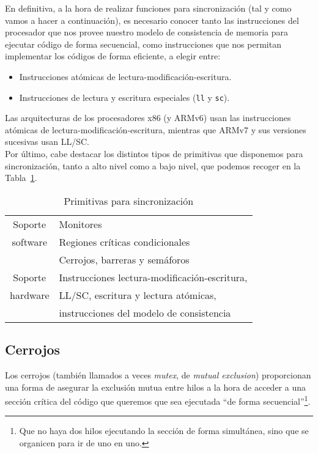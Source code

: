 En definitiva, a la hora de realizar funciones para sincronización (tal y como vamos a hacer a continuación), es necesario conocer tanto las instrucciones del procesador que nos provee nuestro modelo de consistencia de memoria para ejecutar código de forma secuencial, como instrucciones que nos permitan implementar los códigos de forma eficiente, a elegir entre:
\begin{itemize}
    \item Instrucciones atómicas de lectura-modificación-escritura.
    \item Instrucciones de lectura y escritura especiales (\verb|ll| y \verb|sc|).
\end{itemize}
Las arquitecturas de los procesadores x86 (y ARMv6) usan las instrucciones atómicas de lectura-modificación-escritura, mientras que ARMv7 y sus versiones sucesivas usan LL/SC.\\

Por último, cabe destacar los distintos tipos de primitivas que disponemos para sincronización, tanto a alto nivel como a bajo nivel, que podemos recoger en la Tabla~\ref{tab:primitivas_sinc}.
\begin{table}[H]
\centering
\begin{tabular}{cl}
    Soporte & Monitores \\
    software & Regiones críticas condicionales \\
             & Cerrojos, barreras y semáforos \\
    \toprule
    Soporte & Instrucciones lectura-modificación-escritura, \\
    hardware & LL/SC, escritura y lectura atómicas, \\
             & instrucciones del modelo de consistencia
\end{tabular}
\caption{Primitivas para sincronización}
\label{tab:primitivas_sinc}
\end{table}

\subsection{Cerrojos}
Los cerrojos (también llamados a veces \emph{mutex}, de \emph{mutual exclusion}) proporcionan una forma de asegurar la exclusión mutua entre hilos a la hora de acceder a una sección crítica del código que queremos que sea ejecutada ``de forma secuencial''\footnote{Que no haya dos hilos ejecutando la sección de forma simultánea, sino que se organicen para ir de uno en uno.}. 

